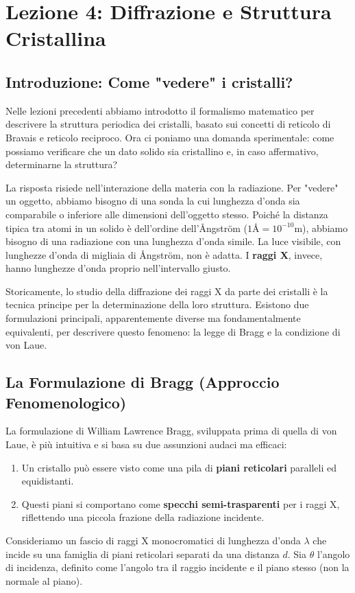 \section{Lezione 4: Diffrazione e Struttura Cristallina}
\label{appendix:lesson04}

\subsection{Introduzione: Come "vedere" i cristalli?}
Nelle lezioni precedenti abbiamo introdotto il formalismo matematico per descrivere la struttura periodica dei cristalli, basato sui concetti di reticolo di Bravais e reticolo reciproco. Ora ci poniamo una domanda sperimentale: come possiamo verificare che un dato solido sia cristallino e, in caso affermativo, determinarne la struttura?

La risposta risiede nell'interazione della materia con la radiazione. Per "vedere" un oggetto, abbiamo bisogno di una sonda la cui lunghezza d'onda sia comparabile o inferiore alle dimensioni dell'oggetto stesso. Poiché la distanza tipica tra atomi in un solido è dell'ordine dell'Ångström ($1\text{Å} = 10^{-10} \text{m}$), abbiamo bisogno di una radiazione con una lunghezza d'onda simile. La luce visibile, con lunghezze d'onda di migliaia di Ångström, non è adatta. I \textbf{raggi X}, invece, hanno lunghezze d'onda proprio nell'intervallo giusto.

Storicamente, lo studio della diffrazione dei raggi X da parte dei cristalli è la tecnica principe per la determinazione della loro struttura. Esistono due formulazioni principali, apparentemente diverse ma fondamentalmente equivalenti, per descrivere questo fenomeno: la legge di Bragg e la condizione di von Laue.

\subsection{La Formulazione di Bragg (Approccio Fenomenologico)}
La formulazione di William Lawrence Bragg, sviluppata prima di quella di von Laue, è più intuitiva e si basa su due assunzioni audaci ma efficaci:
\begin{enumerate}
    \item Un cristallo può essere visto come una pila di \textbf{piani reticolari} paralleli ed equidistanti.
    \item Questi piani si comportano come \textbf{specchi semi-trasparenti} per i raggi X, riflettendo una piccola frazione della radiazione incidente.
\end{enumerate}
Consideriamo un fascio di raggi X monocromatici di lunghezza d'onda $\lambda$ che incide su una famiglia di piani reticolari separati da una distanza $d$. Sia $\theta$ l'angolo di incidenza, definito come l'angolo tra il raggio incidente e il piano stesso (non la normale al piano).


